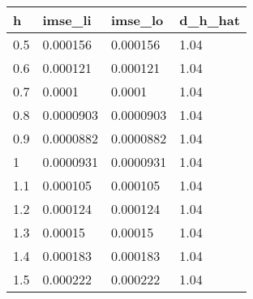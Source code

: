 \begin{tabular}{llll}
  \hline
h & imse\_li & imse\_lo & d\_h\_hat \\ 
  \hline
0.5 & 0.000156 & 0.000156 & 1.04 \\ 
  0.6 & 0.000121 & 0.000121 & 1.04 \\ 
  0.7 & 0.0001 & 0.0001 & 1.04 \\ 
  0.8 & 0.0000903 & 0.0000903 & 1.04 \\ 
  0.9 & 0.0000882 & 0.0000882 & 1.04 \\ 
  1 & 0.0000931 & 0.0000931 & 1.04 \\ 
  1.1 & 0.000105 & 0.000105 & 1.04 \\ 
  1.2 & 0.000124 & 0.000124 & 1.04 \\ 
  1.3 & 0.00015 & 0.00015 & 1.04 \\ 
  1.4 & 0.000183 & 0.000183 & 1.04 \\ 
  1.5 & 0.000222 & 0.000222 & 1.04 \\ 
   \hline
\end{tabular}
